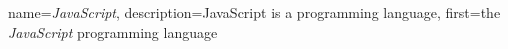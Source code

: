 
\usepackage[automake]{glossaries}

\makeglossaries

{
  name={\emph{JavaScript}},
  description={JavaScript is a programming language},
  first={the \emph{JavaScript} programming language}
}
